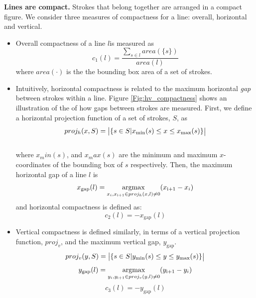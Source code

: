\textbf{Lines are compact.} Strokes that belong together are arranged in a compact figure. We consider three measures of compactness for a line: overall, horizontal and vertical. 
\begin{itemize}

\item Overall compactness of a line $l$is measured as 
\begin{equation}
c_1(l) = \frac{\sum\limits_{s\in l}area(\{s\})}{area(l)}
\end{equation}
where $area(\cdot)$ is the the bounding box area of a set of strokes. 

\item Intuitively, horizontal compactness is related to the maximum horizontal \textit{gap} between strokes within a line. Figure \ref{Fig:hv_compactness} shows an illustration of the of how gaps between strokes are measured. 
First, we define a horizontal projection function of a set of strokes, $S$, as 
\begin{equation}
proj_h(x, S) = \big{|}\{s\in S \small{|} x_\text{min}(s)\le x \le x_\text{max}(s)\}\big{|}
\label{Eq:projh}
\end{equation}\\  
where $x_min(s)$, and $x_max(s)$ are the minimum and maximum $x$-coordinates of the bounding box of $s$ respectively. Then, the maximum horizontal gap of a line $l$ is
\begin{equation}
x_\text{gap}(l) = \operatorname*{argmax}_{x_i, x_\text{i+1} \in proj_{h}(x,l)\ne 0} (x_\text{i+1} - x_i)
\end{equation}
and horizontal compactness is defined as:
\begin{equation}
c_2(l) = -x_\text{gap}(l)
\end{equation}

\item Vertical compactness is defined similarly, in terms of a vertical projection function, $proj_{v}$, and the maximum vertical gap, $y_\text{gap}$.
\begin{equation}
proj_v(y, S) = \big{|}\{s\in S \small{|} y_\text{min}(s)\le y \le y_\text{max}(s)\}\big{|}
\label{Eq:projv}
\end{equation}
\begin{equation}
y_\text{gap}(l) = \operatorname*{argmax}_{y_i, y_\text{i+1} \in proj_{v}(y,l)\ne 0} (y_\text{i+1}
- y_i)
\end{equation}
\begin{equation}
c_3(l) = -y_\text{gap}(l)
\end{equation}

\end{itemize}

